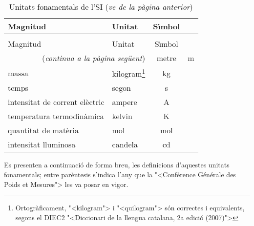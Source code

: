 \begin{longtable}[h]{llc}
   \caption{\label{taula:SI-fonamentals} Unitats fonamentals de l'SI}\\
   \toprule[1pt]
    Magnitud & Unitat & S\'{\i}mbol \\
   \midrule
   \endfirsthead
   \caption[]{Unitats fonamentals de l'SI (\emph{ve de la p\`{a}gina anterior})}\\
   \toprule[1pt]
    Magnitud & Unitat & S\'{\i}mbol \\
   \midrule
   \endhead
   \midrule
   \multicolumn{2}{r}{(\emph{continua a la p\`{a}gina seg\"{u}ent})}
   \endfoot
   \endlastfoot
   longitud & metre & m \\
   massa & kilogram\footnote{Ortogr\`{a}ficament, {"<}kilogram{">} i  {"<}quilogram{">} s\'{o}n correctes i equivalents, segons el DIEC2 {"<}Diccionari de la llengua catalana, 2a edici\'{o} (2007){">}} & kg \\
   temps & segon & s\\
   intensitat de corrent el\`{e}ctric & ampere & A \\
   temperatura termodin\`{a}mica & kelvin & K\\
   quantitat de mat\`{e}ria & mol & mol \\
   intensitat lluminosa & candela &  cd \\
   \bottomrule[1pt]
\end{longtable}
   
   
  
 
   
  

Es presenten a continuaci\'{o} de forma breu, les definicions
d'aquestes unitats fonamentals; entre par\`{e}ntesis s'indica l'any
que la {"<}Conf\'{e}rence G\'{e}n\'{e}rale des Poids et Mesures{">} les va posar en
vigor.
\pagebreak

